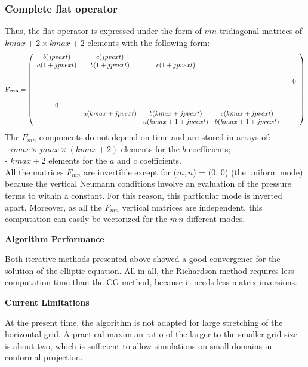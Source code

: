 \subsubsection{Complete flat operator}
Thus, the flat operator is expressed under the form of $m n$ tridiagonal
matrices of $kmax+2 \times kmax+2$ elements with the following form:
\begin{displaymath}
{\bf F_{mn}}=
\left(
\begin{array}{cccccc}
b(jpvext) & c(jpvext)         &   &   &   &   \\
a(1+jpvext) & b(1+jpvext) & c(1+jpvext)          &   &   &   \\
     &      &                &   &   &   \\
     &      &             &   &   & \huge{0}  \\
     &      &                 &   &   &   \\
     &      &                 &   &   &   \\
\huge{0}     &      &               &   &   &   \\
     &  a(kmax+jpvext)    &  b(kmax+jpvext)         &  c(kmax+jpvext)&   &   \\
     &      &                      a(kmax+1+jpvext) &  b(kmax+1+jpvext) & &\\
\end{array}
\right)
\end{displaymath}
The $ F_{mn}$ components do not depend on time and are
stored in arrays of:\\
- $imax \times jmax \times (kmax+2)$ elements for the $b$ coefficients;\\
- $kmax+2$ elements for the $a$ and $c$ coefficients.\\
All the matrices $F_{mn}$ are invertible except for
($m, n$) = (0, 0) (the uniform mode) because the vertical Neumann conditions
involve an evaluation of the pressure terms to within a constant.
For this reason, this particular mode is inverted apart. Moreover, as all the
$F_{mn}$ vertical matrices are independent,
this computation can easily be vectorized for the $m \, n$ different modes.

{\bf Algorithm Performance}

Both iterative methods presented above showed a good convergence for the
solution of the elliptic equation. All in all, the Richardson method
requires less computation time than the CG method, because it needs less
matrix inversions.

{\bf Current Limitations}

At the present time, the algorithm is not adapted for large stretching
of the horizontal grid. A practical maximum ratio of the larger to the
smaller grid size is about two, which is sufficient to allow simulations
on small domains in conformal projection.
